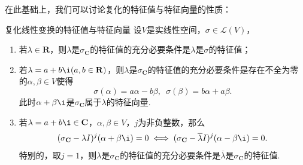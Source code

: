 在此基础上，我们可以讨论复化的特征值与特征向量的性质：

\begin{theorem}{}{复化线性变换的特征值与特征向量}
    设$V$是实线性空间，$\sigma\in \mathcal{L}(V)$，
    \begin{enumerate}
        \item 若$\lambda\in\mathbf{R}$，则$\lambda$是$\sigma_{\mathbf{C}}$的特征值的充分必要条件是$\lambda$是$\sigma$的特征值；
        \item 若$\lambda=a+b\i(a,b\in\mathbf{R})$，则$\lambda$是$\sigma_{\mathbf{C}}$的特征值的充分必要条件是存在不全为零的$\alpha,\beta\in V$使得
        \[\sigma(\alpha)=a\alpha-b\beta,\enspace \sigma(\beta)=b\alpha+a\beta.\]
        此时$\alpha+\beta\i$是$\sigma_{\mathbf{C}}$属于$\lambda$的特征向量.
        \item 若$\lambda=a+b\i \in\mathbf{C}$，$\alpha,\beta\in V$，$j$为非负整数，那么
        \[(\sigma_{\mathbf{C}}-\lambda I)^j(\alpha+\beta\i)=0 \iff (\sigma_{\mathbf{C}}-\overline{\lambda} I)^j(\alpha-\beta\i)=0.\]
        特别的，取$j=1$，则$\lambda$是$\sigma_{\mathbf{C}}$的特征值的充分必要条件是$\overline{\lambda}$是$\sigma_{\mathbf{C}}$的特征值.
    \end{enumerate}
\end{theorem}

